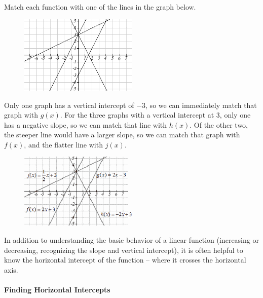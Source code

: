 \begin{example}
Match each function with one of the lines in the graph below.
\begin{figure}[!ht]
\centering
\includegraphics[width=0.5\textwidth]{img/chap1/sec1-4/image052.png}
\caption{}
\end{figure}

\begin{solution} Only one graph has a vertical intercept of $-3$, so we can immediately match that graph with $g(x)$. For the three graphs with a vertical intercept at 3, only one has a negative slope, so we can match that line with $h(x)$. Of the other two, the steeper line would have a larger slope, so we can match that graph with $f(x)$, and the flatter line with $j(x)$.
\begin{figure}[!ht]
\centering
\includegraphics[width=0.5\textwidth]{img/chap1/sec1-4/image095.png}
\caption{}
\end{figure}

\end{solution}\end{example}

In addition to understanding the basic behavior of a linear function (increasing or decreasing, recognizing the slope and vertical intercept), it is often helpful to know the horizontal intercept of the function -- where it crosses the horizontal axis.

\paragraph*{Finding Horizontal Intercepts}

